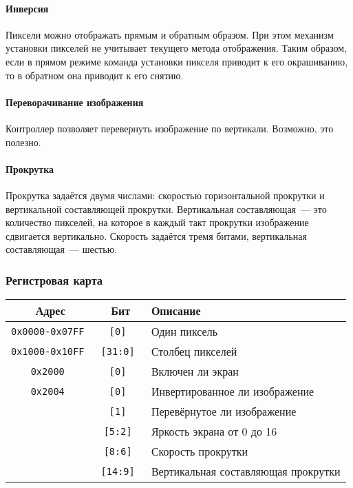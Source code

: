 \documentclass[12pt, a4paper] {ncc}
\begin{document}
\paragraph{Инверсия} Пиксели можно отображать прямым и обратным образом. При
этом механизм установки пикселей не учитывает текущего метода отображения.
Таким образом, если в прямом режиме команда установки пикселя приводит к его
окрашиванию, то в обратном она приводит к его снятию.

\paragraph{Переворачивание изображения} Контроллер позволяет перевернуть
изображение по вертикали. Возможно, это полезно.

\paragraph{Прокрутка} Прокрутка задаётся двумя числами: скоростью
горизонтальной прокрутки и вертикальной составляющей прокрутки. Вертикальная
составляющая~--- это количество пикселей, на которое в каждый такт прокрутки
изображение сдвигается вертикально. Скорость задаётся тремя битами,
вертикальная составляющая~--- шестью.

\subsubsection{Регистровая карта}

\begin{tabular}{|c|c|l|}
        \hline
        \bf Адрес & \bf Бит & \bf Описание \\
        \hline
        \tt 0x0000-0x07FF & \tt [0] & Один пиксель \\
        \hline
        \tt 0x1000-0x10FF & \tt [31:0] & Столбец пикселей \\
        \hline
        \tt 0x2000 & \tt [0] & Включен ли экран \\
        \hline
        \tt 0x2004 & \tt [0] & Инвертированное ли изображение \\
                   & \tt [1] & Перевёрнутое ли изображение \\
                   & \tt [5:2] & Яркость экрана от 0 до 16 \\
                   & \tt [8:6] & Скорость прокрутки \\
                   & \tt [14:9] & Вертикальная составляющая прокрутки \\
        \hline
\end{tabular}
\end{document}
